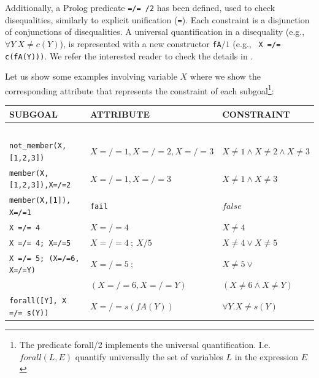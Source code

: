 \documentclass{tlp}
\begin{document}
Additionally, a Prolog predicate {\tt =/= /2} has been defined, used to
check disequalities, similarly to explicit unification ({\tt =}). Each
constraint is a disjunction of conjunctions of disequalities. A
universal quantification in a disequality (e.g., $\forall Y~ X \neq
c(Y)$), is represented with a new constructor {\tt fA}$/1$ (e.g., {\tt
X =/= c(fA(Y)))}.  We refer the interested
reader to check the details in \cite{SusanaPADL2000}.


Let us show some examples involving variable $X$ where we show the
corresponding attribute that represents the constraint of each
subgoal\footnote{The predicate forall/2 implements the universal
quantification. I.e. $forall(L,E)$ quantify universally the set of variables
$L$ in the expression $E$}: 

\begin{center}
\begin{small}
\begin{tabular}{lll}
SUBGOAL & ATTRIBUTE & CONSTRAINT \\
\hline\hline
\ \\
{\tt not\_member(X,[1,2,3])}   &  $X=/=1,X=/=2,X=/=3$  & $X \neq 1 \wedge X \neq 2 \wedge X \neq 3$\\
{\tt member(X,[1,2,3]),X=/=2}  &  $X=/=1,X=/=3$        & $X \neq 1 \wedge X \neq 3$\\
{\tt member(X,[1]), X=/=1}     &  {\tt fail}           & $false$ \\
{\tt X =/= 4}                  & $X=/=4$               & $X \neq 4$ \\
{\tt X =/= 4; X=/=5}           & $X=/=4~ ;~ X/5$       & $X \neq 4 \vee X \neq 5$ \\
{\tt X =/= 5; (X=/=6, X=/=Y)}  & $X=/=5 ~;                 $    & $X \neq 5 \vee                           $\\
                               & $           (X=/=6, X=/=Y)$    & $              (X \neq 6 \wedge X \neq Y)$\\
{\tt forall([Y], X =/= s(Y))}  & $X=/=s(fA(Y))$         & $\forall Y. X \neq s(Y)$ \\
\end{tabular}
\end{small}
\end{center}
\end{document}
